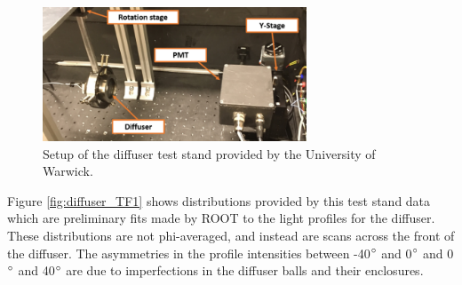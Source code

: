 \begin{figure}
    \centering
    \includegraphics[width=0.7\textwidth]{Figures/diffuser_test_stand.png}
    \caption{Setup of the diffuser test stand provided by the University of Warwick.}
    \label{fig:diffuser_test_stand}
\end{figure}

Figure \ref{fig:diffuser_TF1} shows distributions provided by this test stand data which are preliminary fits made by ROOT to the light profiles for the diffuser. These distributions are not phi-averaged, and instead are scans across the front of the diffuser. The asymmetries in the profile intensities between -40$\degree$ and 0$\degree$ and 0$\degree$ and 40$\degree$ are due to imperfections in the diffuser balls and their enclosures. 

